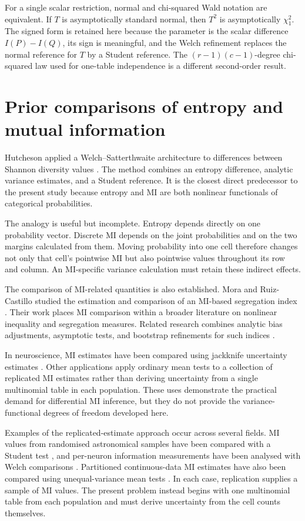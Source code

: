 For a single scalar restriction, normal and chi-squared Wald notation are
equivalent. If \(T\) is asymptotically standard normal, then \(T^2\) is
asymptotically \(\chi^2_1\). The signed form is retained here because the
parameter is the scalar difference \(I(P)-I(Q)\), its sign is meaningful, and
the Welch refinement replaces the normal reference for \(T\) by a Student
reference. The \((r-1)(c-1)\)-degree chi-squared law used for one-table
independence is a different second-order result.

\section{Prior comparisons of entropy and mutual information}

Hutcheson applied a Welch--Satterthwaite architecture to differences between
Shannon diversity values \citep{hutcheson1970}. The method combines an entropy
difference, analytic variance estimates, and a Student reference. It is the
closest direct predecessor to the present study because entropy and MI are
both nonlinear functionals of categorical probabilities.

The analogy is useful but incomplete. Entropy depends directly on one
probability vector. Discrete MI depends on the joint probabilities and on the
two margins calculated from them. Moving probability into one cell therefore
changes not only that cell's pointwise MI but also pointwise values throughout
its row and column. An MI-specific variance calculation must retain these
indirect effects.

The comparison of MI-related quantities is also established. Mora and
Ruiz-Castillo studied the estimation and comparison of an MI-based segregation
index \citep{mora2009,mora2011}. Their work places MI comparison within a
broader literature on nonlinear inequality and segregation measures. Related
research combines analytic bias adjustments, asymptotic tests, and bootstrap
refinements for such indices \citep{allen2015}.

In neuroscience, MI estimates have been compared using jackknife uncertainty
estimates \citep{hart2010}. Other applications apply ordinary mean tests to a
collection of replicated MI estimates rather than deriving uncertainty from a
single multinomial table in each population. These uses demonstrate the
practical demand for differential MI inference, but they do not provide the
variance-functional degrees of freedom developed here.

Examples of the replicated-estimate approach occur across several fields.
MI values from randomised astronomical samples have been compared with a
Student test \citep{sarkar2020}, and per-neuron information measurements have
been analysed with Welch comparisons \citep{prince2021}. Partitioned
continuous-data MI estimates have also been compared using unequal-variance
mean tests \citep{martin2026}. In each case, replication supplies a sample of
MI values. The present problem instead begins with one multinomial table from
each population and must derive uncertainty from the cell counts themselves.

